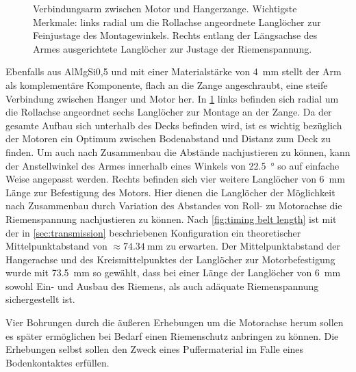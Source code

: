 		\begin{figure}[h]
			\centering
			
			\caption[Verbindungsarm zwischen Motor und Hangerzange]{Verbindungsarm zwischen Motor und Hangerzange. Wichtigste Merkmale: links radial um die Rollachse angeordnete Langlöcher zur Feinjustage des Montagewinkels. Rechts entlang der Längsachse des Armes ausgerichtete Langlöcher zur Justage der Riemenspannung.}%
			\label{fig:motor piece drawing}
		\end{figure}
		\newpage
		Ebenfalls aus AlMgSi0,5 und mit einer Materialstärke von \qty{4}{\milli\metre} stellt der Arm als komplementäre Komponente, flach an die Zange angeschraubt, eine steife Verbindung zwischen Hanger und Motor her.
		In \cref{fig:motor piece drawing} links befinden sich radial um die Rollachse angeordnet sechs Langlöcher zur Montage an der Zange.
		Da der gesamte Aufbau sich unterhalb des Decks befinden wird, ist es wichtig bezüglich der Motoren ein Optimum zwischen Bodenabstand und Distanz zum Deck zu finden.
		Um auch nach Zusammenbau die Abstände nachjustieren zu können, kann der Anstellwinkel des Armes innerhalb eines Winkels von \qty{22,5}{\degree} so auf einfache Weise angepasst werden.
		Rechts befinden sich vier weitere Langlöcher von \qty{6}{\milli\metre} Länge zur Befestigung des Motors.
		Hier dienen die Langlöcher der Möglichkeit nach Zusammenbau durch Variation des Abstandes von Roll- zu Motorachse die Riemenspannung nachjustieren zu können.
		Nach \cref{fig:timing belt length} ist mit der in \cref{sec:transmission} beschriebenen Konfiguration ein theoretischer Mittelpunktabstand von \(\approx \qty{74,34}{\milli\metre}\) zu erwarten.
		Der Mittelpunktabstand der Hangerachse und des Kreismittelpunktes der Langlöcher zur Motorbefestigung wurde mit \qty{73,5}{\milli\metre} so gewählt, dass bei einer Länge der Langlöcher von \qty{6}{\milli\metre} sowohl Ein- und Ausbau des Riemens, als auch adäquate Riemenspannung sichergestellt ist.

		Vier Bohrungen durch die äußeren Erhebungen um die Motorachse herum sollen es später ermöglichen bei Bedarf einen Riemenschutz anbringen zu können.
		Die Erhebungen selbst sollen den Zweck eines Puffermaterial im Falle eines Bodenkontaktes erfüllen.
